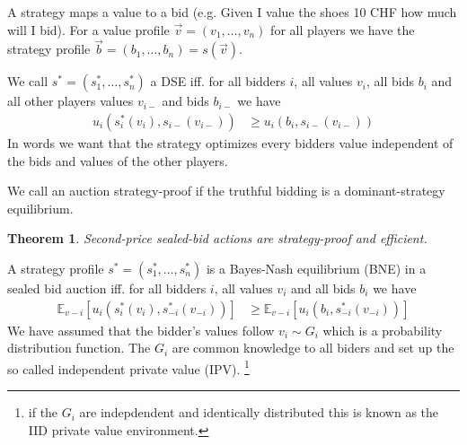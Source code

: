 \documentclass[12pt]{article}
\newtheorem{theorem}{Theorem}
\theoremstyle{definition}
\theoremstyle{remark}
\newcommand{\E}{\mathbb{E}}
\begin{document}
\begin{definition}[Strategy]
	A strategy maps a value to a bid (e.g. Given I value the shoes 10 CHF how much will I bid). For a value profile $\vec{v} = (v_1,\ldots,v_n)$ for all players we have the strategy profile $\vec{b} = (b_1,\ldots,b_n) = s(\vec{v})$.
\end{definition}


\begin{definition}
We call $s^* = (s_1^*, \ldots, s_n^*)$ a DSE iff. for all bidders $i$, all values $v_i$, all bids $b_i$ and all other players values $v_{i-}$ and bids $b_{i-}$ we have
\begin{align*}
	u_i(s_i^*(v_i),s_{i-}(v_{i-})) &\geq 	u_i(b_i,s_{i-}(v_{i-}))
\end{align*}
In words we want that the strategy optimizes every bidders value independent of the bids and values of the other players.
\end{definition}



\begin{definition}
We call an auction strategy-proof if the truthful bidding is a dominant-strategy equilibrium.
\end{definition}


\begin{theorem}
	Second-price sealed-bid actions are strategy-proof and efficient.
\end{theorem}



\begin{definition}
	A strategy profile $s^* = (s_1^*,\ldots,s_n^*)$ is a Bayes-Nash equilibrium (BNE) in a sealed bid auction iff. for all bidders $i$, all values $v_i$ and all bids $b_i$ we have
	\begin{align*}
\E_{v-i}\left[u_i(s_i^*(v_i),s_{-i}^*(v_{-i}))\right] &\geq \E_{v-i}\left[u_i(b_i,s_{-i}^*(v_{-i}))\right]
	\end{align*}
	We have assumed that the bidder's values follow $v_i\sim G_i$ which is a probability distribution function. The $G_i$ are common knowledge to all biders and set up the so called independent private value (IPV). \footnote{if the $G_i$ are indepdendent and identically distributed this is known as the IID private value environment.}
\end{definition}
\end{document}
